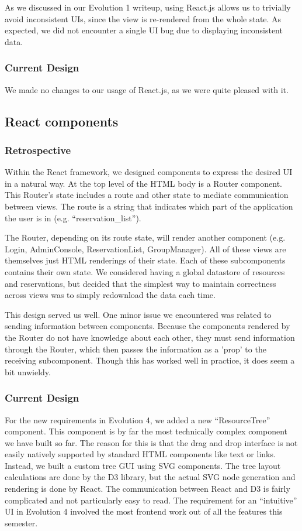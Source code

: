 \documentclass[12pt]{article}
\begin{document}
As we discussed in our Evolution 1 writeup, using React.js allows us to trivially avoid inconsistent UIs, since the view is re-rendered from the whole state. As expected, we did not encounter a single UI bug due to displaying inconsistent data.

\subsubsection{Current Design}
We made no changes to our usage of React.js, as we were quite pleased with it.

\subsection{React components}
\subsubsection{Retrospective}
Within the React framework, we designed components to express the desired UI in a natural way. At the top level of the HTML body is a Router component. This Router's state includes a route and other state to mediate communication between views. The route is a string that indicates which part of the application the user is in (e.g. ``reservation\_list'').

The Router, depending on its route state, will render another component (e.g. Login, AdminConsole, ReservationList, GroupManager). All of these views are themselves just HTML renderings of their state. Each of these subcomponents contains their own state. We considered having a global datastore of resources and reservations, but decided that the simplest way to maintain correctness across views was to simply redownload the data each time.

This design served us well. One minor issue we encountered was related to sending information between components. Because the components rendered by the Router do not have knowledge about each other, they must send information through the Router, which then passes the information as a 'prop' to the receiving subcomponent. Though this has worked well in practice, it does seem a bit unwieldy.

\subsubsection{Current Design}
For the new requirements in Evolution 4, we added a new ``ResourceTree'' component. This component is by far the most technically complex component we have built so far. The reason for this is that the drag and drop interface is not easily natively supported by standard HTML components like text or links. Instead, we built a custom tree GUI using SVG components. The tree layout calculations are done by the D3 library, but the actual SVG node generation and rendering is done by React. The communication between React and D3 is fairly complicated and not particularly easy to read. The requirement for an ``intuitive'' UI in Evolution 4 involved the most frontend work out of all the features this semester.
\end{document}
